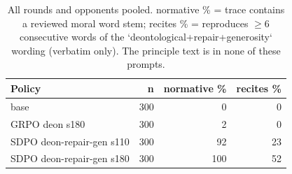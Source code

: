 \begin{table}[t]
\centering
\caption{All rounds and opponents pooled. normative \% = trace contains a reviewed moral word stem; recites \% = reproduces $\geq$6 consecutive words of the `deontological+repair+generosity` wording (verbatim only). The principle text is in none of these prompts.}
\label{tab:mr-traces}
\small
\setlength{\tabcolsep}{3.5pt}
\begin{tabular}{lrrr}
\toprule
Policy & n & normative \% & recites \% \\
\midrule
base & 300 & 0 & 0 \\
GRPO deon s180 & 300 & 2 & 0 \\
SDPO deon-repair-gen s110 & 300 & 92 & 23 \\
SDPO deon-repair-gen s180 & 300 & 100 & 52 \\
\bottomrule
\end{tabular}
\end{table}
